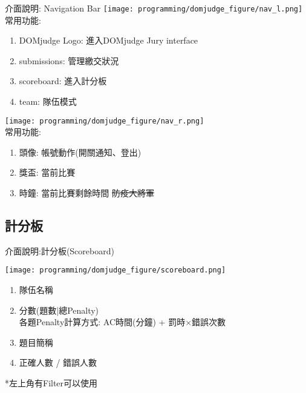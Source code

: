 \documentclass[aspectratio=169,xcolor=dvipsnames]{beamer}
\begin{document}
    \begin{frame}{介面說明: Navigation Bar}
        \texttt{[image: programming/domjudge\_figure/nav\_l.png]} \\
        常用功能:
        \begin{enumerate}
            \item DOMjudge Logo: 進入DOMjudge Jury interface
            \item submissions: 管理繳交狀況
            \item scoreboard: 進入計分板
            \item team: 隊伍模式
        \end{enumerate} \par
        
        \texttt{[image: programming/domjudge\_figure/nav\_r.png]}\\
        常用功能:
        \begin{enumerate}
            \item 頭像: 帳號動作(開關通知、登出)
            \item 獎盃: 當前比賽
            \item 時鐘: 當前比賽剩餘時間 \sout{防疫大將軍}
        \end{enumerate}
        
    \end{frame}

    \subsection{計分板}
    \begin{frame}{介面說明:計分板(Scoreboard)}
        \centerline{\texttt{[image: programming/domjudge\_figure/scoreboard.png]}}
        \begin{enumerate}
            \item 隊伍名稱
            \item 分數(題數|總Penalty) \\
                各題Penalty計算方式: AC時間(分鐘) + 罰時$\times$錯誤次數
            \item 題目簡稱
            \item 正確人數 / 錯誤人數
        \end{enumerate}
        
        *左上角有Filter可以使用
    \end{frame}
    
\end{document}
